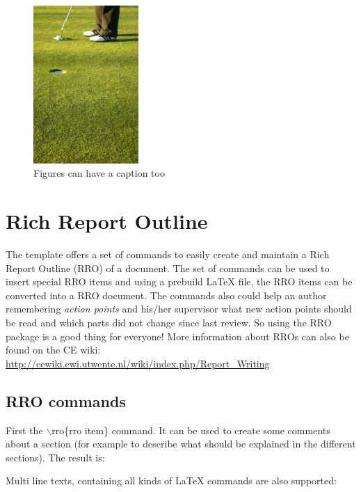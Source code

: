 \begin{figure}[h!t]
	\begin{center}
		\includegraphics[height=60mm]{images/demo.png}
	\end{center}
	\caption{Figures can have a caption too}
	\label{fig:demofig}
\end{figure}

\section{Rich Report Outline}
The template offers a set of commands to easily create and maintain a Rich Report Outline (RRO) of a document.
The set of commands can be used to insert special RRO items and using a prebuild \LaTeX{} file, the RRO items can be converted into a RRO document.
The commands also could help an author remembering \textit{action points} and his/her supervisor what new action points should be read and which parts did not change since last review.
So using the RRO package is a good thing for everyone!
More information about RROs can also be found on the CE wiki: \url{http://cewiki.ewi.utwente.nl/wiki/index.php/Report_Writing}

\subsection{RRO commands}
First the $\backslash$rro\{rro item\} command.
It can be used to create some comments about a section (for example to describe what should be explained in the different sections).
The result is:

Multi line texts, containing all kinds of \LaTeX{} commands are also supported:\par
{}


